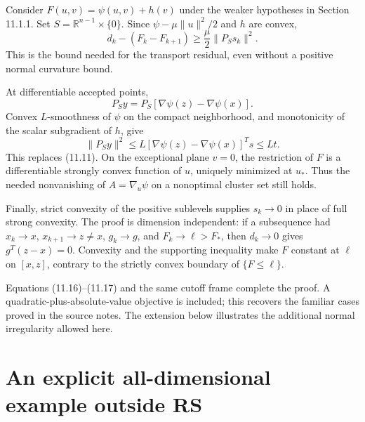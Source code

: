 Consider \(F(u,v)=\psi(u,v)+h(v)\) under the weaker hypotheses in
Section 11.1.1. Set \(S=\mathbb R^{n-1}\times\{0\}\). Since
\(\psi-\mu\|u\|^2/2\) and \(h\) are convex, \[
 d_k-(F_k-F_{k+1})\ge\frac\mu2\|P_Ss_k\|^2.\tag{11.16}
\] This is the bound needed for the transport residual, even without a
positive normal curvature bound.

At differentiable accepted points, \[
 P_Sy=P_S[\nabla\psi(z)-\nabla\psi(x)].
\] Convex \(L\)-smoothness of \(\psi\) on the compact neighborhood, and
monotonicity of the scalar subgradient of \(h\), give \[
 \|P_Sy\|^2
 \le L[\nabla\psi(z)-\nabla\psi(x)]^Ts
 \le Lt.\tag{11.17}
\] This replaces (11.11). On the exceptional plane \(v=0\), the restriction
of \(F\) is a differentiable strongly convex function of \(u\), uniquely
minimized at \(u_*\). Thus the needed nonvanishing of \(A=\nabla_u\psi\)
on a nonoptimal cluster set still holds.

Finally, strict convexity of the positive sublevels supplies \(s_k\to0\)
in place of full strong convexity. The proof is dimension independent:
if a subsequence had \(x_k\to x\), \(x_{k+1}\to z\ne x\), \(g_k\to g\),
and \(F_k\to\ell>F_*\), then \(d_k\to0\) gives \(g^T(z-x)=0\). Convexity
and the supporting inequality make \(F\) constant at \(\ell\) on
\([x,z]\), contrary to the strictly convex boundary of \(\{F\le\ell\}\).

Equations (11.16)--(11.17) and the same cutoff frame complete the proof. A
quadratic-plus-absolute-value objective is included; this recovers the
familiar cases proved in the source notes. The extension below
illustrates the additional normal irregularity allowed here.


\setcounter{section}{6}
\setcounter{theorem}{0}
\setcounter{lemma}{0}
\setcounter{corollary}{0}
\setcounter{proposition}{0}
\setcounter{remark}{0}
\setcounter{equation}{0}


\section{An explicit all-dimensional example outside
RS}\label{U:an-explicit-all-dimensional-example-outside-rs}


